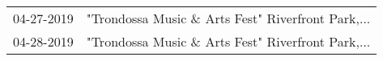 \begin{supertabular}{ll}
 04-27-2019 &  "Trondossa Music \& Arts Fest" Riverfront Park,... \\
 04-28-2019 &  "Trondossa Music \& Arts Fest" Riverfront Park,... \\
\end{supertabular}
